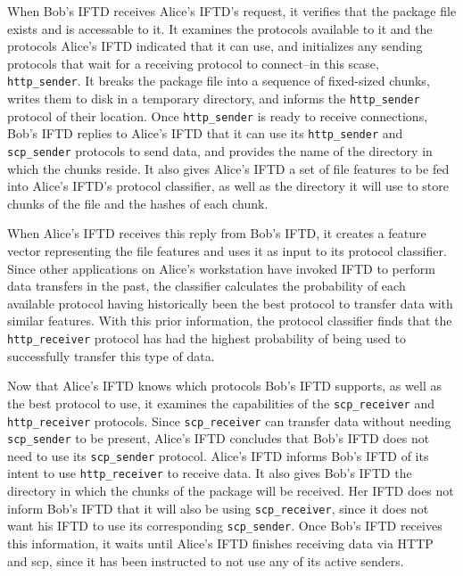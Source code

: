 When Bob's IFTD receives Alice's IFTD's request, it verifies that the package file exists and is accessable to it.  It examines the protocols available to it and the protocols Alice's IFTD indicated that it can use, and initializes any sending protocols that wait for a receiving protocol to connect--in this scase, \texttt{http\_sender}.  It breaks the package file into a sequence of fixed-sized chunks, writes them to disk in a temporary directory, and informs the \texttt{http\_sender} protocol of their location.  Once \texttt{http\_sender} is ready to receive connections, Bob's IFTD replies to Alice's IFTD that it can use its \texttt{http\_sender} and \texttt{scp\_sender} protocols to send data, and provides the name of the directory in which the chunks reside.  It also gives Alice's IFTD a set of file features to be fed into Alice's IFTD's protocol classifier, as well as the directory it will use to store chunks of the file and the hashes of each chunk.

When Alice's IFTD receives this reply from Bob's IFTD, it creates a feature vector representing the file features and uses it as input to its protocol classifier.  Since other applications on Alice's workstation have invoked IFTD to perform data transfers in the past, the classifier calculates the probability of each available protocol having historically been the best protocol to transfer data with similar features.  With this prior information, the protocol classifier finds that the \texttt{http\_receiver} protocol has had the highest probability of being used to successfully transfer this type of data.

Now that Alice's IFTD knows which protocols Bob's IFTD supports, as well as the best protocol to use, it examines the capabilities of the \texttt{scp\_receiver} and \texttt{http\_receiver} protocols.  Since \texttt{scp\_receiver} can transfer data without needing \texttt{scp\_sender} to be present, Alice's IFTD concludes that Bob's IFTD does not need to use its \texttt{scp\_sender} protocol.  Alice's IFTD informs Bob's IFTD of its intent to use \texttt{http\_receiver} to receive data.  It also gives Bob's IFTD the directory in which the chunks of the package will be received.  Her IFTD does not inform Bob's IFTD that it will also be using \texttt{scp\_receiver}, since it does not want his IFTD to use its corresponding \texttt{scp\_sender}.  Once Bob's IFTD receives this information, it waits until Alice's IFTD finishes receiving data via HTTP and scp, since it has been instructed to not use any of its active senders.

